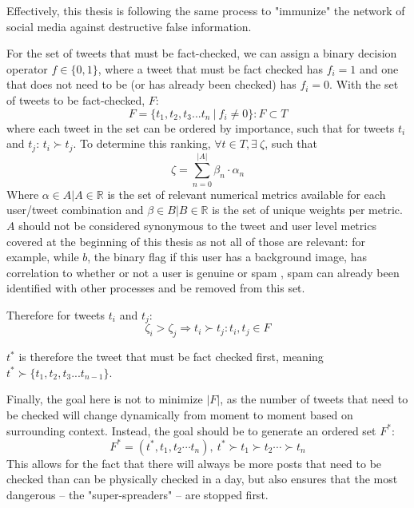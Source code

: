 \documentclass[NETN,manuscript]{stjour-new}
\begin{document}
 Effectively, this thesis is following the same process to "immunize" the network of social media against destructive false information.
 
 For the set of tweets that must be fact-checked, we can assign a binary decision operator $f \in \{0,1\}$, where a tweet that must be fact checked has $f_i = 1$ and one that does not need to be (or has already been checked) has $f_i = 0$. With the set of tweets to be fact-checked, $F$:
 \begin{equation}
 \label{Factcheckset}
 F=\{t_1, t_2, t_3 ... t_n \ |\ f_i \neq 0\}: F \subset T
 \end{equation}
 where each tweet in the set can be ordered by importance, such that for tweets $t_i$ and $t_j$: $t_i \succ t_j$. To determine this ranking, $\forall t \in T, \exists \  \zeta$, such that 
 \begin{equation}
     \zeta = \sum_{n=0}^{|A|} \beta_{n} \cdot \alpha_{n}
 \end{equation}
 Where $\alpha \in A | A \in \mathbb{R}$ is the set of relevant numerical metrics available for each user/tweet combination and $\beta \in B| B \in \mathbb{R}$ is the set of unique weights per metric. $A$ should not be considered synonymous to the tweet and user level metrics covered at the beginning of this thesis as not all of those are relevant: for example, while $b$, the binary flag if this user has a background image, has correlation to whether or not a user is genuine or spam \citep{liu2019early}, spam can already been identified with other processes and be removed from this set.
 
 Therefore for tweets $t_i$ and $t_j$: 
  \begin{equation}
      \zeta_i > \zeta_j \Rightarrow t_i \succ t_j : t_i, t_j \in F
  \end{equation}
  
  $t^*$ is therefore the tweet that must be fact checked first, meaning  $t^* \succ \{t_1, t_2, t_3 ... t_{n-1}\}$. 
  
  Finally, the goal here is not to minimize $|F|$, as the number of tweets that need to be checked will change dynamically from moment to moment based on surrounding context. Instead, the goal should be to generate an ordered set $F^*$:
  \begin{equation}
      F^* = (t^*, t_1, t_2 \cdots t_n), \ t^* \succ t_1 \succ t_2 \cdots \succ t_n
  \end{equation}
  This allows for the fact that there will always be more posts that need to be checked than can be physically checked in a day, but also ensures that the most dangerous -- the "super-spreaders" -- are stopped first.
\end{document}
